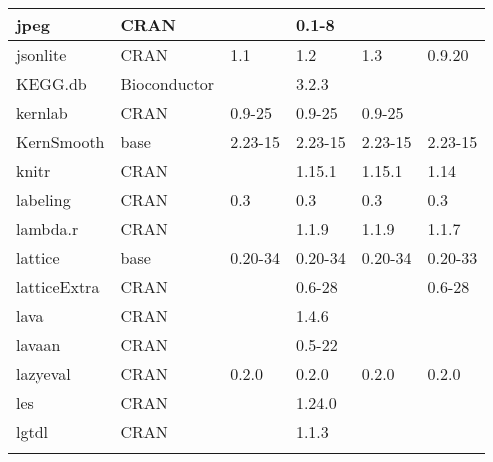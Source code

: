 \begin{longtable}{|llllll|}
jpeg                          & CRAN                      &             & 0.1-8       &                &                   \\ \hline \rowcolor{gray!25}
jsonlite                      & CRAN                      & 1.1         & 1.2         & 1.3            & 0.9.20           \\ \hline
KEGG.db                       & Bioconductor              &             & 3.2.3       &                &                   \\ \hline \rowcolor{gray!25}
kernlab                       & CRAN                      & 0.9-25      & 0.9-25      & 0.9-25         &                  \\ \hline
KernSmooth                    & base                      & 2.23-15     & 2.23-15     & 2.23-15        & 2.23-15           \\ \hline \rowcolor{gray!25}
knitr                         & CRAN                      &             & 1.15.1      & 1.15.1         & 1.14             \\ \hline
labeling                      & CRAN                      & 0.3         & 0.3         & 0.3            & 0.3               \\ \hline \rowcolor{gray!25}
lambda.r                      & CRAN                      &             & 1.1.9       & 1.1.9          & 1.1.7            \\ \hline
lattice                       & base                      & 0.20-34     & 0.20-34     & 0.20-34        & 0.20-33           \\ \hline \rowcolor{gray!25}
latticeExtra                  & CRAN                      &             & 0.6-28      &                & 0.6-28           \\ \hline
lava                          & CRAN                      &             & 1.4.6       &                &                   \\ \hline \rowcolor{gray!25}
lavaan                        & CRAN                      &             & 0.5-22      &                &                  \\ \hline
lazyeval                      & CRAN                      & 0.2.0       & 0.2.0       & 0.2.0          & 0.2.0             \\ \hline \rowcolor{gray!25}
les                           & CRAN                      &             & 1.24.0      &                &                  \\ \hline
lgtdl                         & CRAN                      &             & 1.1.3       &                &                   \\ \hline \rowcolor{gray!25}

\end{longtable}
